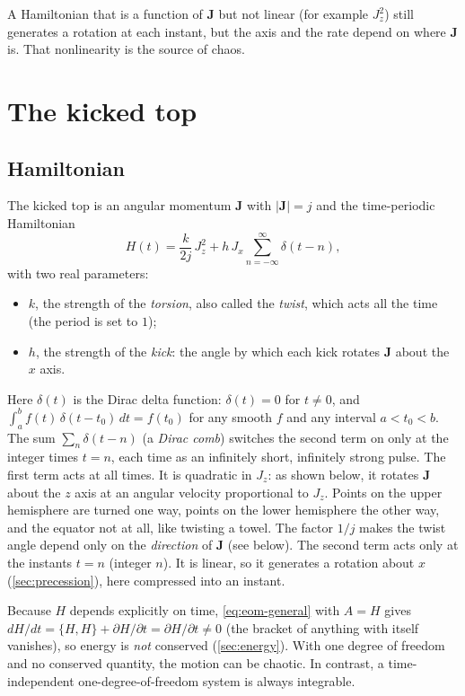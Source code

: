 \documentclass[11pt,a4paper]{article}
\newcommand{\vJ}{\bm{J}}
\newcommand{\PB}[2]{\{#1,#2\}}
\begin{document}
A Hamiltonian that is a function of $\vJ$ but not linear (for example $J_z^2$) still generates a rotation at each
instant, but the axis and the rate depend on where $\vJ$ is. That nonlinearity is the source of chaos.

\section{The kicked top}\label{sec:model}

\subsection{Hamiltonian}

The kicked top is an angular momentum $\vJ$ with $|\vJ| = j$ and the time-periodic Hamiltonian
\begin{equation}\label{eq:H}
  \boxed{H(t) = \frac{k}{2j}\, J_z^2 + h\, J_x \sum_{n=-\infty}^{\infty} \delta(t-n) ,}
\end{equation}
with two real parameters:
\begin{itemize}
  \item $k$, the strength of the \emph{torsion}, also called the \emph{twist}, which acts all the time (the period
  is set to $1$);
  \item $h$, the strength of the \emph{kick}: the angle by which each kick rotates $\vJ$ about the $x$ axis.
\end{itemize}
Here $\delta(t)$ is the Dirac delta function: $\delta(t) = 0$ for $t\ne0$, and $\int_a^b f(t)\,\delta(t-t_0)\,dt =
f(t_0)$ for any smooth $f$ and any interval $a < t_0 < b$. The sum $\sum_n\delta(t-n)$ (a \emph{Dirac comb}) switches
the second term on only at the integer times $t = n$, each time as an infinitely short, infinitely strong pulse.
The first term acts at all times. It is quadratic in $J_z$: as shown below, it rotates $\vJ$ about the $z$ axis at
an angular velocity proportional to $J_z$. Points on the upper hemisphere are turned one way, points on the lower
hemisphere the other way, and the equator not at all, like twisting a towel. The factor $1/j$ makes the twist angle depend only on the
\emph{direction} of $\vJ$ (see below). The second term acts only at the instants $t = n$ (integer $n$). It is
linear, so it generates a rotation about $x$ (\cref{sec:precession}), here compressed into an instant.

Because $H$ depends explicitly on time, \eqref{eq:eom-general} with $A = H$ gives $dH/dt = \PB{H}{H} + \partial
H/\partial t = \partial H/\partial t \ne 0$ (the bracket of anything with itself vanishes), so energy is \emph{not} conserved
(\cref{sec:energy}). With one degree of freedom and no conserved quantity, the motion can be chaotic. In contrast, a
time-independent one-degree-of-freedom system is always integrable.
\end{document}
